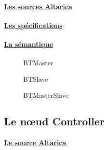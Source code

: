     \paragraph{\underline{Les sources Altarica\\}}
    
    
    
    
    \paragraph{\underline{Les spécifications\\}}
    
    
    

    \paragraph{\underline{La sémantique}}
    \begin{figure}[!ht]
     \begin{center}
      \caption{BTMaster}
     \end{center}
    \end{figure}
    \begin{figure}[!ht]
     \begin{center}
      \caption{BTSlave}
     \end{center}
    \end{figure}
    \begin{figure}[!ht]
     \begin{center}
      \caption{BTMasterSlave}
     \end{center}
    \end{figure}
   
  \subsection{Le n\oe{}ud Controller}
   
    \paragraph{\underline{Le source Altarica\\}}
    
    
